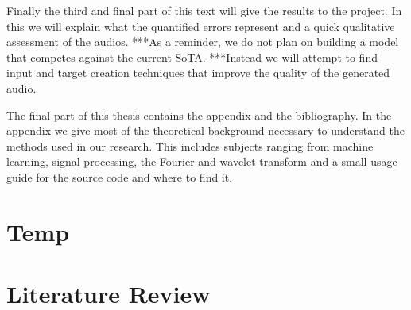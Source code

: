 \documentclass{book}
\begin{document}
\par
Finally the third and final part of this text will give the results to the project.
In this we will explain what the quantified errors represent and a quick qualitative assessment of the audios.
***As a reminder, we do not plan on building a model that competes against the current SoTA.
***Instead we will attempt to find input and target creation techniques that improve the quality of the generated audio.
\par
The final part of this thesis contains the appendix and the bibliography.
In the appendix we give most of the theoretical background necessary to understand the methods used in our research.
This includes subjects ranging from machine learning, signal processing, the Fourier and wavelet transform and a small usage guide for the source code and where to find it.
\part*{Temp}
\part{Literature Review}
\end{document}
